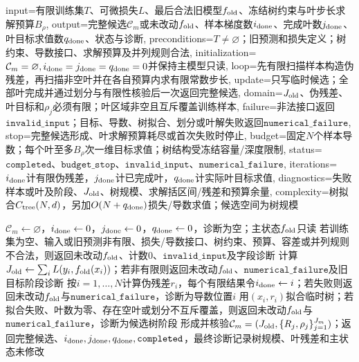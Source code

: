 \begin{AlgorithmContract}{
  input={有限训练集$T$、可微损失$L$、最后合法旧模型$f_{\rm old}$、冻结树约束与叶步长求解预算$B_\rho$},
  output={完整候选$\mathcal C_m$或未改动$f_{\rm old}$、样本梯度数$i_{\rm done}$、完成叶数$j_{\rm done}$、叶目标求值数$q_{\rm done}$、状态与诊断},
  preconditions={$T\ne\varnothing$；旧预测和损失定义；树约束、导数接口、求解预算及并列规则合法},
  initialization={$\mathcal C_m=\varnothing,i_{\rm done}=j_{\rm done}=q_{\rm done}=0$并保持主模型只读},
  loop={先有限扫描样本构造伪残差，再扫描非空叶并在各自预算内求有限常数步长},
  update={只写临时候选；全部叶完成并通过划分与有限性核验后一次返回完整候选},
  domain={$J_{\rm old}$、伪残差、叶目标和$\rho_j$必须有限；叶区域非空且互斥覆盖训练样本},
  failure={非法接口返回$\mathtt{invalid\_input}$；目标、导数、树拟合、划分或叶解失败返回$\mathtt{numerical\_failure}$},
  stop={完整候选形成、叶求解预算耗尽或首次失败时停止},
  budget={固定$N$个样本导数；每个叶至多$B_\rho$次一维目标求值；树结构受冻结容量/深度限制},
  status={$\mathtt{completed}$、$\mathtt{budget\_stop}$、$\mathtt{invalid\_input}$、$\mathtt{numerical\_failure}$},
  iterations={$i_{\rm done}$计有限伪残差，$j_{\rm done}$计已完成叶，$q_{\rm done}$计实际叶目标求值},
  diagnostics={失败样本或叶及阶段、$J_{\rm old}$、树规模、求解括区间/残差和预算余量},
  complexity={树拟合$C_{\rm tree}(N,d)$，另加$O(N+q_{\rm done})$损失/导数求值；候选空间为树规模}
}
\begin{algorithm}[H]
\caption{一般损失梯度提升的候选生成}\label{alg:V3-C03-gradient-candidate}
$\mathcal C_m\leftarrow\varnothing$，$i_{\rm done}\leftarrow0$，$j_{\rm done}\leftarrow0$，$q_{\rm done}\leftarrow0$，诊断为空；主状态$f_{\rm old}$只读\;
若训练集为空、输入或旧预测非有限、损失/导数接口、树约束、预算、容差或并列规则不合法，则返回未改动$f_{\rm old}$、计数$0$、$\mathtt{invalid\_input}$及字段诊断\;
计算$J_{\rm old}\leftarrow\sum_iL(y_i,f_{\rm old}(x_i))$；若非有限则返回未改动$f_{\rm old}$、$\mathtt{numerical\_failure}$及旧目标阶段诊断\;
按$i=1,\ldots,N$计算伪残差$r_i$，每个有限结果令$i_{\rm done}\leftarrow i$；若失败则返回未改动$f_{\rm old}$与$\mathtt{numerical\_failure}$，诊断为导数位置$i$\;
用$(x_i,r_i)$拟合临时树；若拟合失败、叶数为零、存在空叶或划分不互斥覆盖，则返回未改动$f_{\rm old}$与$\mathtt{numerical\_failure}$，诊断为候选树阶段\;
形成并核验$\mathcal C_m=(J_{\rm old},\{R_j,\rho_j\}_{j=1}^{J_m})$；返回完整候选、$i_{\rm done},j_{\rm done},q_{\rm done},\mathtt{completed}$，最终诊断记录树规模、叶残差和主状态未修改\;
\end{algorithm}
\end{AlgorithmContract}

